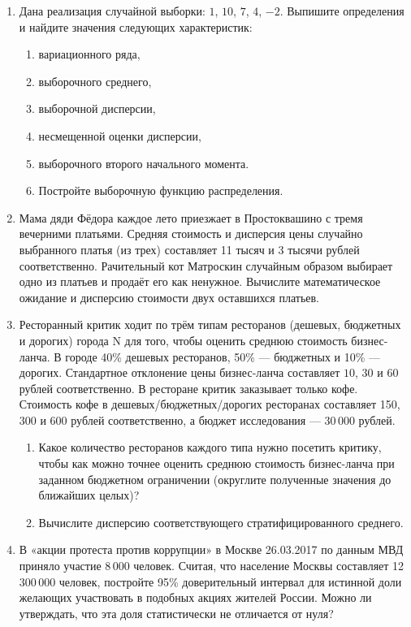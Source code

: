 \documentclass[12pt, a4paper]{article}\usepackage[]{graphicx}\usepackage[]{color}
\begin{document}
\begin{enumerate}

\item Дана реализация случайной выборки: $1$, $10$, $7$, $4$, $-2$. Выпишите определения и найдите значения следующих характеристик:
\begin{enumerate}
  \item вариационного ряда,
  \item выборочного среднего,
  \item выборочной дисперсии,
  \item несмещенной оценки дисперсии,
  \item выборочного второго начального момента.
  \item Постройте выборочную функцию распределения.
\end{enumerate}


\item
Мама дяди Фёдора каждое лето приезжает в Простоквашино с тремя вечерними платьями. Средняя стоимость и дисперсия цены случайно выбранного платья (из трех) составляет 11 тысяч и 3 тысячи рублей соответственно. Рачительный кот Матроскин случайным образом выбирает одно из платьев и продаёт его как ненужное. Вычислите математическое ожидание и дисперсию стоимости двух оставшихся платьев.

\item
Ресторанный критик ходит по трём типам ресторанов (дешевых, бюджетных и дорогих) города N для того, чтобы оценить среднюю стоимость бизнес-ланча. В городе 40\%
дешевых ресторанов, 50\% — бюджетных и 10\% — дорогих. Стандартное отклонение цены бизнес-ланча составляет $10$, $30$ и $60$ рублей соответственно. В ресторане критик заказывает только кофе. Стоимость кофе в дешевых/бюджетных/дорогих ресторанах составляет 150, 300 и 600 рублей соответственно, а бюджет исследования — 30\,000 рублей.
\begin{enumerate}
  \item Какое количество ресторанов каждого типа нужно посетить критику, чтобы как можно точнее оценить среднюю стоимость бизнес-ланча при заданном бюджетном ограничении (округлите полученные значения до ближайших целых)?
  \item Вычислите дисперсию соответствующего стратифицированного среднего.
\end{enumerate}

\item
В «акции протеста против коррупции» в Москве 26.03.2017 по данным МВД приняло участие 8\,000 человек. Считая, что население Москвы составляет 12\,300\,000 человек, постройте 95\% доверительный интервал для истинной доли желающих участвовать в подобных акциях жителей России. Можно ли утверждать, что эта доля статистически не отличается от нуля?


\end{enumerate}
\end{document}
